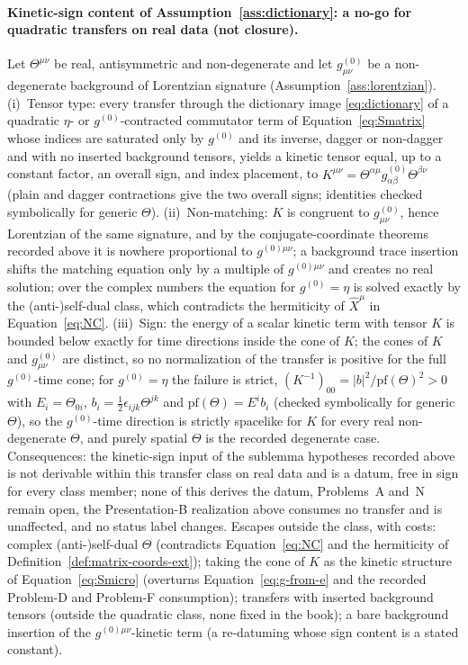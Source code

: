\paragraph{Kinetic-sign content of Assumption~\ref{ass:dictionary}: a no-go for quadratic transfers on real data (not closure).}
Let \(\Theta^{\mu\nu}\) be real, antisymmetric and non-degenerate and let \(g^{(0)}_{\mu\nu}\) be a non-degenerate background of Lorentzian signature (Assumption~\ref{ass:lorentzian}). (i)~Tensor type: every transfer through the dictionary image \eqref{eq:dictionary} of a quadratic \(\eta\)- or \(g^{(0)}\)-contracted commutator term of Equation~\eqref{eq:Smatrix} whose indices are saturated only by \(g^{(0)}\) and its inverse, dagger or non-dagger and with no inserted background tensors, yields a kinetic tensor equal, up to a constant factor, an overall sign, and index placement, to \(K^{\mu\nu}=\Theta^{\alpha\mu}g^{(0)}_{\alpha\beta}\Theta^{\beta\nu}\) (plain and dagger contractions give the two overall signs; identities checked symbolically for generic \(\Theta\)). (ii)~Non-matching: \(K\) is congruent to \(g^{(0)}_{\mu\nu}\), hence Lorentzian of the same signature, and by the conjugate-coordinate theorems recorded above it is nowhere proportional to \(g^{(0)\mu\nu}\); a background trace insertion shifts the matching equation only by a multiple of \(g^{(0)\mu\nu}\) and creates no real solution; over the complex numbers the equation for \(g^{(0)}=\eta\) is solved exactly by the (anti-)self-dual class, which contradicts the hermiticity of \(\hat X^\mu\) in Equation~\eqref{eq:NC}. (iii)~Sign: the energy of a scalar kinetic term with tensor \(K\) is bounded below exactly for time directions inside the cone of \(K\); the cones of \(K\) and \(g^{(0)}_{\mu\nu}\) are distinct, so no normalization of the transfer is positive for the full \(g^{(0)}\)-time cone; for \(g^{(0)}=\eta\) the failure is strict, \((K^{-1})_{00}=|b|^2/\mathrm{pf}(\Theta)^2>0\) with \(E_i=\Theta_{0i}\), \(b_i=\tfrac12\epsilon_{ijk}\Theta^{jk}\) and \(\mathrm{pf}(\Theta)=E^ib_i\) (checked symbolically for generic \(\Theta\)), so the \(g^{(0)}\)-time direction is strictly spacelike for \(K\) for every real non-degenerate \(\Theta\), and purely spatial \(\Theta\) is the recorded degenerate case. Consequences: the kinetic-sign input of the sublemma hypotheses recorded above is not derivable within this transfer class on real data and is a datum, free in sign for every class member; none of this derives the datum, Problems~A and~N remain open, the Presentation-B realization above consumes no transfer and is unaffected, and no status label changes. Escapes outside the class, with costs: complex (anti-)self-dual \(\Theta\) (contradicts Equation~\eqref{eq:NC} and the hermiticity of Definition~\ref{def:matrix-coords-ext}); taking the cone of \(K\) as the kinetic structure of Equation~\eqref{eq:Smicro} (overturns Equation~\eqref{eq:g-from-e} and the recorded Problem-D and Problem-F consumption); transfers with inserted background tensors (outside the quadratic class, none fixed in the book); a bare background insertion of the \(g^{(0)\mu\nu}\)-kinetic term (a re-datuming whose sign content is a stated constant).
